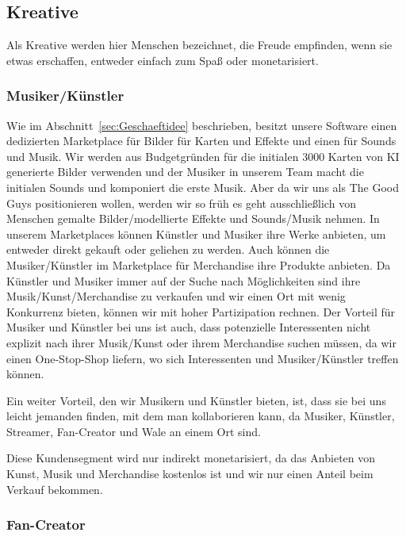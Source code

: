 \documentclass[fontsize=11, a4aper]{scrartcl}
\begin{document}
\subsection{Kreative} \label{subsec:Kreative}

Als Kreative werden hier Menschen bezeichnet, die Freude empfinden, wenn sie etwas erschaffen, entweder einfach zum Spaß oder monetarisiert.

\subsubsection{Musiker/Künstler} \label{subsubsec:Musiker_Kuenstler}

Wie im Abschnitt~\ref{sec:Geschaeftidee} beschrieben, besitzt unsere Software einen dedizierten Marketplace für Bilder für Karten und Effekte und einen für Sounds und Musik. Wir werden aus Budgetgründen für die initialen 3000 Karten von KI generierte Bilder verwenden und der Musiker in unserem Team macht die initialen Sounds und komponiert die erste Musik. Aber da wir uns als \glqq The Good Guys\grqq{} positionieren wollen, werden wir so früh es geht ausschließlich von Menschen gemalte Bilder/modellierte Effekte und Sounds/Musik nehmen. In unserem Marketplaces können Künstler und Musiker ihre Werke anbieten, um entweder direkt gekauft oder geliehen zu werden. Auch können die Musiker/Künstler im Marketplace für Merchandise ihre Produkte anbieten. Da Künstler und Musiker immer auf der Suche nach Möglichkeiten sind ihre Musik/Kunst/Merchandise zu verkaufen und wir einen Ort mit wenig Konkurrenz bieten, können wir mit hoher Partizipation rechnen. Der Vorteil für Musiker und Künstler bei uns ist auch, dass potenzielle Interessenten nicht explizit nach ihrer Musik/Kunst oder ihrem Merchandise suchen müssen, da wir einen One-Stop-Shop liefern, wo sich Interessenten und Musiker/Künstler treffen können.\hfill\newline

\noindent Ein weiter Vorteil, den wir Musikern und Künstler bieten, ist, dass sie bei uns leicht jemanden finden, mit dem man kollaborieren kann, da Musiker, Künstler, Streamer, Fan-Creator und Wale an einem Ort sind.\hfill\newline

\noindent Diese Kundensegment wird nur indirekt monetarisiert, da das Anbieten von Kunst, Musik und Merchandise kostenlos ist und wir nur einen Anteil beim Verkauf bekommen.

\subsubsection{Fan-Creator} \label{subsubsec:Fan_Creator}
\end{document}
